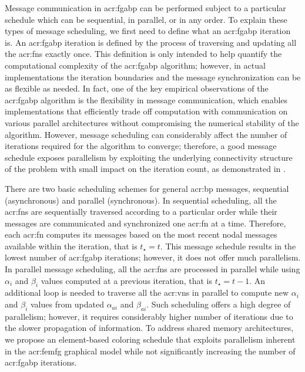 Message communication in \gls{acr:fgabp} can be performed subject to a particular schedule which can be sequential, in parallel, or in any order.
To explain these types of message scheduling, we first need to define what an \gls{acr:fgabp} iteration is.
An \gls{acr:fgabp} iteration is defined by the process of traversing and updating all the \glspl{acr:fn} exactly once.
This definition is only intended to help quantify the computational complexity of the \gls{acr:fgabp} algorithm; however, in actual implementations the iteration boundaries and the message synchronization can be as flexible as needed.
In fact, one of the key empirical observations of the \gls{acr:fgabp} algorithm is the flexibility in message communication, which enables implementations that efficiently trade off computation with communication on various parallel architectures without compromising the numerical stability of the algorithm.
However, message scheduling can considerably affect the number of iterations required for the algorithm to converge; therefore, a good message schedule exposes parallelism by exploiting the underlying connectivity structure of the problem \cite{bib:El-Kurdi2012EIOGBPSFLSDDLS} with small impact on the iteration count, as demonstrated in .

There are two basic scheduling schemes for general \gls{acr:bp} messages, sequential (asynchronous) and parallel (synchronous).
In sequential scheduling, all the \glspl{acr:fn} are sequentially traversed according to a particular order while their messages are communicated and synchronized one \gls{acr:fn} at a time.
Therefore, each \gls{acr:fn} computes its messages based on the most recent nodal messages available within the iteration, that is $t_\star = t$.
This message schedule results in the lowest number of \gls{acr:fgabp} iterations; however, it does not offer much parallelism.
In parallel message scheduling, all the \glspl{acr:fn} are processed in parallel while using $\alpha_i$ and $\beta_i$ values computed at a previous iteration, that is $t_\star = t-1$.
An additional loop is needed to traverse all the \glspl{acr:vn} in parallel to compute new $\alpha_i$ and $\beta_i$ values from updated $\alpha_{ai}$ and $\beta_{ai}$.
Such scheduling offers a high degree of parallelism; however, it requires considerably higher number of iterations due to the slower propagation of information.
To address shared memory architectures, we propose an element-based coloring schedule that exploits parallelism inherent in the \gls{acr:femfg} graphical model while not significantly increasing the number of \gls{acr:fgabp} iterations.


